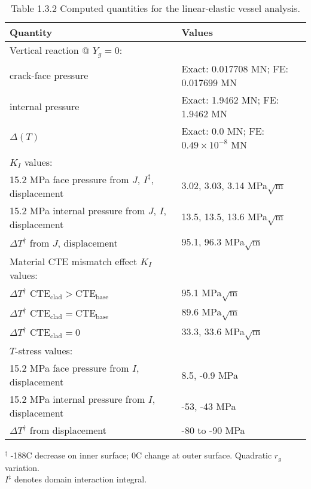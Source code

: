 \documentclass[11pt]{report}
\numberwithin{equation}{section}
\begin{document}
\begin{table}[htb]	
\centering
{
\setlength{\extrarowheight}{2.2pt}
\small
\begin{tabular}{ | p{3.2in} | p{2.5in} | }
\hline
\textbf{Quantity} & \textbf{Values} \\
\hline \hline
Vertical reaction @ $Y_g=0$:  &  \\ \hline
\hspace{2em}crack-face pressure & Exact: 0.017708 MN; FE: 0.017699 MN \\ \hline
\hspace{2em}internal pressure & Exact: 1.9462 MN; FE: 1.9462 MN \\ \hline
\hspace{2em}$\Delta ( T )$ & Exact: 0.0 MN; FE: $0.49 \times 10^{-8}$ MN \\ \hline
$K_I$ values: &  \\ \hline
\hspace{1em}15.2 MPa face pressure from $J$, $I^\ddag$, displacement & 3.02, 3.03, 3.14 MPa$\sqrt{\mathrm{m}}$ \\ \hline
\hspace{1em}15.2  MPa internal pressure from $J$, $I$, displacement & 13.5, 13.5, 13.6  MPa$\sqrt{\mathrm{m}}$ \\ \hline
\hspace{1em}$\Delta T^\dag$ from $J$, displacement & 95.1, 96.3 MPa$\sqrt{\mathrm{m}}$ \\ \hline
Material CTE mismatch effect $K_I$ values: &  \\ \hline
\hspace{2em}$\Delta T^\dag$ $\mathrm{CTE_{clad}>CTE_{base}}$  & 95.1 MPa$\sqrt{\mathrm{m}}$ \\ \hline
\hspace{2em}$\Delta T^\dag$ $\mathrm{CTE_{clad}=CTE_{base}}$ & 89.6 MPa$\sqrt{\mathrm{m}}$ \\ \hline
\hspace{2em}$\Delta T^\dag$ $\mathrm{CTE_{clad}=0}$ & 33.3, 33.6 MPa$\sqrt{\mathrm{m}}$ \\ \hline
$T$-stress values: &  \\ \hline
\hspace{1em}15.2 MPa face pressure from $I$, displacement & 8.5, -0.9 MPa \\ \hline
\hspace{1em}15.2 MPa internal pressure from $I$, displacement & -53, -43 MPa \\ \hline
\hspace{1em}$\Delta T^\dag$ from  displacement & -80 to -90  MPa \\ \hline
\end{tabular}}
\small
$^\dag$ -188C decrease on inner surface; 0C change at outer surface. Quadratic $r_g$ variation.	\\
$I^\ddag$ denotes domain interaction integral.
%
\normalsize
\caption{Table 1.3.2 
Computed quantities for the linear-elastic vessel analysis.}
\label{table:linear-vessel-results}
\end{table}
\end{document}
